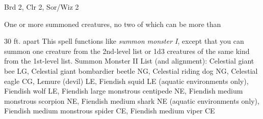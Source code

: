 
\begin{description*}
\item[Level:] Brd 2, Clr 2, Sor/Wiz 2
\item[Effect:] One or more summoned creatures, no two of which can be more than
\end{description*}

30 ft. apart
This spell functions like \textit{summon monster I}, except that you can summon
one creature from the 2nd-level list or 1d3 creatures of the same kind from the
1st-level list.
Summon Monster II List (and alignment): Celestial giant bee LG, Celestial giant bombardier beetle NG, Celestial riding dog NG, Celestial eagle CG, Lemure (devil) LE, Fiendish squid LE (aquatic environments only), Fiendish wolf LE, Fiendish large monstrous centipede NE, Fiendish medium monstrous scorpion NE, Fiendish medium shark NE (aquatic environments only), Fiendish medium monstrous spider CE, Fiendish medium viper CE